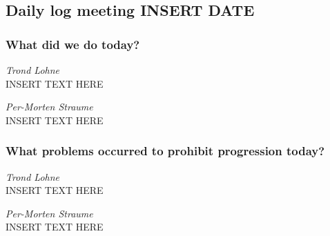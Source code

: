 \begin{center}
\subsection*{Daily log meeting INSERT DATE}
\end{center}
\bigskip


\subsubsection*{What did we do today?}

\noindent\textit{Trond Lohne}\\
INSERT TEXT HERE

\medskip

\noindent\textit{Per-Morten Straume}\\
INSERT TEXT HERE


\subsubsection*{What problems occurred to prohibit progression today?}

\noindent\textit{Trond Lohne}\\
INSERT TEXT HERE

\medskip

\noindent\textit{Per-Morten Straume}\\
INSERT TEXT HERE


\newpage